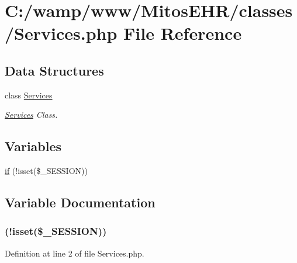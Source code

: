 \hypertarget{_services_8php}{\section{\-C\-:/wamp/www/\-Mitos\-E\-H\-R/classes/\-Services.php \-File \-Reference}
\label{_services_8php}
}
\subsection*{\-Data \-Structures}
\begin{DoxyCompactItemize}
\item 
class \hyperlink{class_services}{\-Services}
\begin{DoxyCompactList}\small\item\em \hyperlink{class_services}{\-Services} \-Class. \end{DoxyCompactList}\end{DoxyCompactItemize}
\subsection*{\-Variables}
\begin{DoxyCompactItemize}
\item 
\hyperlink{_services_8php_a8ceca98aa29914fd2479a84a8d2242fb}{if} (!isset(\$\-\_\-\-S\-E\-S\-S\-I\-O\-N))
\end{DoxyCompactItemize}


\subsection{\-Variable \-Documentation}
\hypertarget{_services_8php_a8ceca98aa29914fd2479a84a8d2242fb}{
\subsubsection[{if}]{(!isset(\$\-\_\-\-S\-E\-S\-S\-I\-O\-N))}}\label{_services_8php_a8ceca98aa29914fd2479a84a8d2242fb}


\-Definition at line 2 of file \-Services.\-php.

